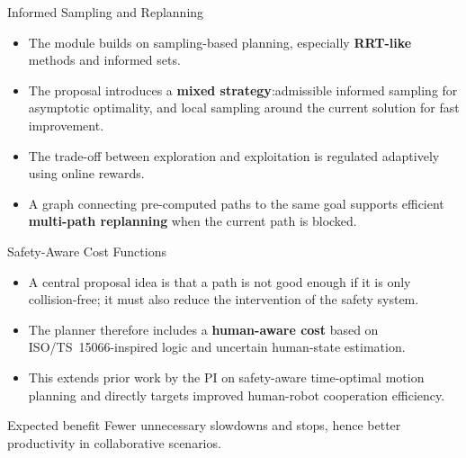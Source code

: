 \documentclass[aspectratio=169,10pt]{beamer}
\begin{document}
\begin{frame}{Informed Sampling and Replanning}

\begin{itemize}
  \item The module builds on sampling-based planning, especially \textbf{RRT-like} methods and informed sets.
  \item The proposal introduces a \textbf{mixed strategy}:\@global admissible informed sampling for asymptotic optimality, and local sampling around the current solution for fast improvement.
  \item The trade-off between exploration and exploitation is regulated adaptively using online rewards.
  \item A graph connecting pre-computed paths to the same goal supports efficient \textbf{multi-path replanning} when the current path is blocked.
\end{itemize}

\end{frame}


\begin{frame}{Safety-Aware Cost Functions}

\begin{itemize}
  \item A central proposal idea is that a path is not good enough if it is only collision-free; it must also reduce the intervention of the safety system.
  \item The planner therefore includes a \textbf{human-aware cost} based on ISO/TS~15066-inspired logic and uncertain human-state estimation.
  \item This extends prior work by the PI on safety-aware time-optimal motion planning and directly targets improved human-robot cooperation efficiency.
\end{itemize}
\begin{alertblock}{Expected benefit}
Fewer unnecessary slowdowns and stops, hence better productivity in collaborative scenarios.
\end{alertblock}

\end{frame}
\end{document}

